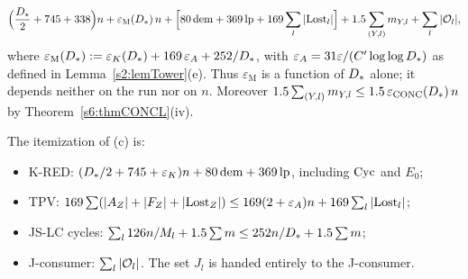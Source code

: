\begin{theorem}[Theorem MIX-C: the assembly with $\mathcal V=\emptyset$, deterministic form]
\begin{enumerate}
\[
\Bigl(\frac{D_{*}}2+745+338\Bigr)n+\varepsilon_{\mathrm M}(D_{*})\,n+\Bigl[80\,\mathrm{dem}+369\,\mathrm{lp}+169\sum_l|\mathrm{Lost}_l|\Bigr]+1.5\sum_{(Y,l)}m_{Y,l}+\sum_l|\mathcal{O}_l|,
\]
where $\varepsilon_{\mathrm M}(D_{*}):=\varepsilon_{K}(D_{*})+169\,\varepsilon_{A}+252/D_{*}$, with $\varepsilon_{A}=31\varepsilon/(C'\log\log D_{*})$ as defined in Lemma~\ref{s2:lemTower}(e). Thus $\varepsilon_{\mathrm M}$ is a function of $D_{*}$ alone; it depends neither on the run nor on $n$. Moreover $1.5\sum_{(Y,l)}m_{Y,l}\le1.5\,\varepsilon_{\mathrm{CONC}}(D_{*})\,n$ by Theorem~\ref{s6:thmCONCL}(iv).
\end{enumerate}
The itemization of (c) is:
\begin{itemize}
\item K-RED: $(D_{*}/2+745+\varepsilon_{K})n+80\,\mathrm{dem}+369\,\mathrm{lp}$, including $\mathrm{Cyc}$ and $E_0$;
\item TPV: $169\sum(|A_Z|+|F_Z|+|\mathrm{Lost}_Z|)\le169(2+\varepsilon_{A})n+169\sum_l|\mathrm{Lost}_l|$;
\item JS-LC cycles: $\sum_l126n/M_l+1.5\sum m\le252n/D_{*}+1.5\sum m$;
\item J-consumer: $\sum_l|\mathcal{O}_l|$. The set $J_l$ is handed entirely to the J-consumer.
\end{itemize}
\deps{\ref{s6:consOrder}, \ref{s4:lemTPV}, \ref{s5:lemKRED}, \ref{s5:lemDemoted}, \ref{s6:lemJSLC}, \ref{s6:lemJplus}, \ref{s6:defJconsumer}, \ref{s6:lemLent}, \ref{s6:thmCONCL}, \ref{s2:propStructure}, \ref{s2:propParentless}, \ref{s2:propOV}, \ref{s2:lemTower}, \ref{s3:defCOL}, \ref{s3:lemCOL}, \ref{s4:lemPV}, \ref{s5:lemChild}, \ref{s4:thmVXp}, \ref{s2:defHBtp}, \ref{s1:condG3}, \ref{s6:defDesign}, \ref{s6:defLending}}
\end{theorem}

